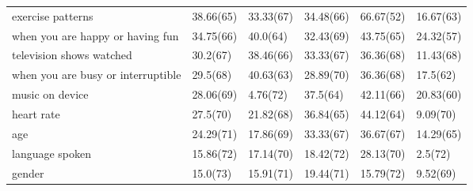\documentclass[a4paper,12pt]{article}
\begin{document}
\begin{longtable}{| p{7cm} | l | l | l | l | l |}
exercise patterns & 38.66(65) & 33.33(67) & 34.48(66) & 66.67(52) & 16.67(63) \\ 
when you are happy or having fun & 34.75(66) & 40.0(64) & 32.43(69) & 43.75(65) & 24.32(57) \\ 
television shows watched & 30.2(67) & 38.46(66) & 33.33(67) & 36.36(68) & 11.43(68) \\ 
when you are busy or interruptible & 29.5(68) & 40.63(63) & 28.89(70) & 36.36(68) & 17.5(62) \\ 
music on device & 28.06(69) & 4.76(72) & 37.5(64) & 42.11(66) & 20.83(60) \\ 
heart rate & 27.5(70) & 21.82(68) & 36.84(65) & 44.12(64) & 9.09(70) \\ 
age & 24.29(71) & 17.86(69) & 33.33(67) & 36.67(67) & 14.29(65) \\ 
language spoken & 15.86(72) & 17.14(70) & 18.42(72) & 28.13(70) & 2.5(72) \\ 
gender & 15.0(73) & 15.91(71) & 19.44(71) & 15.79(72) & 9.52(69) \\ 
\end{longtable}
\end{document}
